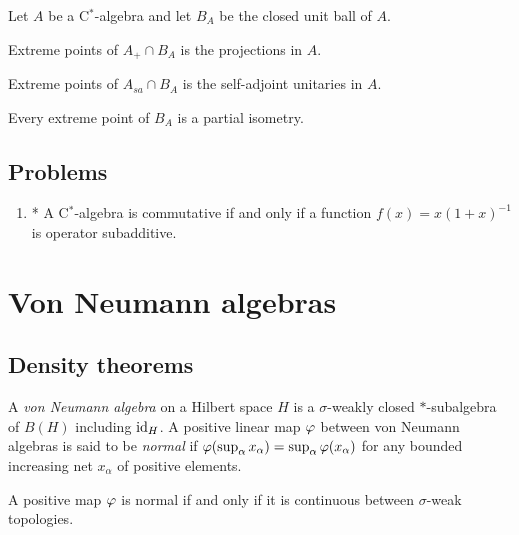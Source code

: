 \documentclass{../../large}
\begin{document}
\begin{prb}
Let $A$ be a C$^*$-algebra and let $B_A$ be the closed unit ball of $A$.
\begin{parts}
\item Extreme points of $A_+\cap B_A$ is the projections in $A$.
\item Extreme points of $A_{sa}\cap B_A$ is the self-adjoint unitaries in $A$.
\item Every extreme point of $B_A$ is a partial isometry.
\end{parts}
\end{prb}

\section*{Problems}
\begin{enumerate}
\item* A C$^*$-algebra is commutative if and only if a function $f(x)=x(1+x)^{-1}$ is operator subadditive.
\end{enumerate}







\chapter{Von Neumann algebras}


\section{Density theorems}


\begin{prb}
A \emph{von Neumann algebra} on a Hilbert space $H$ is a $\sigma$-weakly closed $*$-subalgebra of $B(H)$ including $\operatorname{id}_H$.
A positive linear map $\varphi$ between von Neumann algebras is said to be \emph{normal} if $\varphi(\sup_\alpha x_\alpha)=\sup_\alpha\varphi(x_\alpha)$ for any bounded increasing net $x_\alpha$ of positive elements.
\begin{parts}
\item A positive map $\varphi$ is normal if and only if it is continuous between $\sigma$-weak topologies.
\end{parts}
\end{prb}
\end{document}
